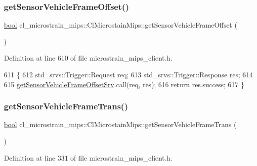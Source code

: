 \subsubsection{\texorpdfstring{get\+Sensor\+Vehicle\+Frame\+Offset()}{getSensorVehicleFrameOffset()}}
{\footnotesize\ttfamily \hyperlink{classbool}{bool} cl\+\_\+microstrain\+\_\+mips\+::\+Cl\+Microstain\+Mips\+::get\+Sensor\+Vehicle\+Frame\+Offset (\begin{DoxyParamCaption}{ }\end{DoxyParamCaption})\hspace{0.3cm}{\ttfamily [inline]}}



Definition at line 610 of file microstrain\+\_\+mips\+\_\+client.\+h.


\begin{DoxyCode}
611     \{
612         std\_srvs::Trigger::Request req;
613         std\_srvs::Trigger::Response res;
614 
615         \hyperlink{classcl__microstrain__mips_1_1ClMicrostainMips_a12957749416c955e1b0132cb2213f879}{getSensorVehicleFrameOffsetSrv}.call(req, res);
616         \textcolor{keywordflow}{return} res.success;
617     \}
\end{DoxyCode}
\mbox{\label{classcl__microstrain__mips_1_1ClMicrostainMips_a184450cf337fe02c9ef4101520d9f9a5}} 
\subsubsection{\texorpdfstring{get\+Sensor\+Vehicle\+Frame\+Trans()}{getSensorVehicleFrameTrans()}}
{\footnotesize\ttfamily \hyperlink{classbool}{bool} cl\+\_\+microstrain\+\_\+mips\+::\+Cl\+Microstain\+Mips\+::get\+Sensor\+Vehicle\+Frame\+Trans (\begin{DoxyParamCaption}{ }\end{DoxyParamCaption})\hspace{0.3cm}{\ttfamily [inline]}}



Definition at line 331 of file microstrain\+\_\+mips\+\_\+client.\+h.


